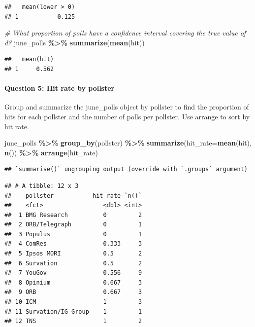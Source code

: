 \documentclass[
]{article}
\newenvironment{Shaded}{\begin{snugshade}}{\end{snugshade}}
\newcommand{\CommentTok}[1]{\textcolor[rgb]{0.56,0.35,0.01}{\textit{#1}}}
\newcommand{\DataTypeTok}[1]{\textcolor[rgb]{0.13,0.29,0.53}{#1}}
\newcommand{\KeywordTok}[1]{\textcolor[rgb]{0.13,0.29,0.53}{\textbf{#1}}}
\newcommand{\NormalTok}[1]{#1}
\newcommand{\OperatorTok}[1]{\textcolor[rgb]{0.81,0.36,0.00}{\textbf{#1}}}
\newcommand{\StringTok}[1]{\textcolor[rgb]{0.31,0.60,0.02}{#1}}
\begin{document}
\begin{verbatim}
##   mean(lower > 0)
## 1           0.125
\end{verbatim}

\begin{Shaded}
\begin{Highlighting}[]
\CommentTok{\# What proportion of polls have a confidence interval covering the true value of d?}
\NormalTok{june\_polls }\OperatorTok{\%\textgreater{}\%}\StringTok{ }\KeywordTok{summarize}\NormalTok{(}\KeywordTok{mean}\NormalTok{(hit))}
\end{Highlighting}
\end{Shaded}

\begin{verbatim}
##   mean(hit)
## 1     0.562
\end{verbatim}

\hypertarget{question-5-hit-rate-by-pollster}{%
\paragraph{Question 5: Hit rate by
pollster}\label{question-5-hit-rate-by-pollster}}

Group and summarize the june\_polls object by pollster to find the
proportion of hits for each pollster and the number of polls per
pollster. Use arrange to sort by hit rate.

\begin{Shaded}
\begin{Highlighting}[]
\NormalTok{june\_polls }\OperatorTok{\%\textgreater{}\%}
\StringTok{  }\KeywordTok{group\_by}\NormalTok{(pollster) }\OperatorTok{\%\textgreater{}\%}
\StringTok{  }\KeywordTok{summarize}\NormalTok{(}\DataTypeTok{hit\_rate=}\KeywordTok{mean}\NormalTok{(hit), }\KeywordTok{n}\NormalTok{()) }\OperatorTok{\%\textgreater{}\%}
\StringTok{  }\KeywordTok{arrange}\NormalTok{(hit\_rate)}
\end{Highlighting}
\end{Shaded}

\begin{verbatim}
## `summarise()` ungrouping output (override with `.groups` argument)
\end{verbatim}

\begin{verbatim}
## # A tibble: 12 x 3
##    pollster           hit_rate `n()`
##    <fct>                 <dbl> <int>
##  1 BMG Research          0         2
##  2 ORB/Telegraph         0         1
##  3 Populus               0         1
##  4 ComRes                0.333     3
##  5 Ipsos MORI            0.5       2
##  6 Survation             0.5       2
##  7 YouGov                0.556     9
##  8 Opinium               0.667     3
##  9 ORB                   0.667     3
## 10 ICM                   1         3
## 11 Survation/IG Group    1         1
## 12 TNS                   1         2
\end{verbatim}
\end{document}
